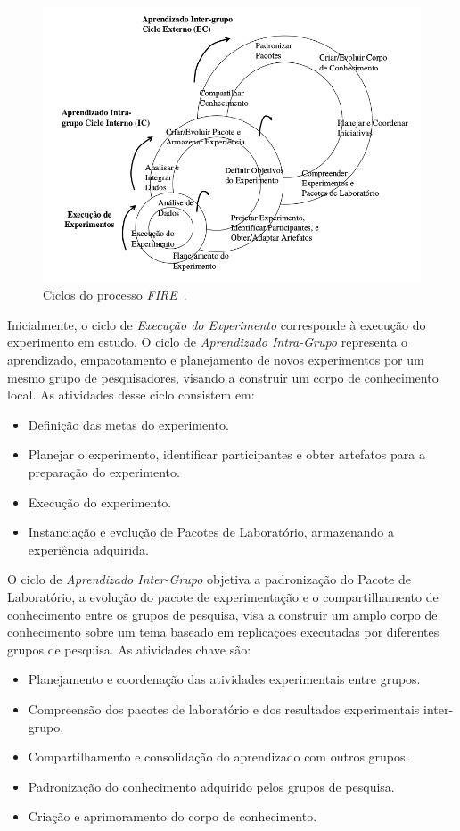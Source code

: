 \begin{figure}[!htb]
\centering
\includegraphics[width=\textwidth]{images/fire.png}
\caption{Ciclos do processo \textit{FIRE}~\cite{mendoncca2008framework}.}\label{image:fire}
\end{figure}

Inicialmente, o ciclo de \textit{Execução do Experimento} corresponde à execução do experimento em estudo. O ciclo de \textit{Aprendizado Intra-Grupo} representa o aprendizado, empacotamento e planejamento de novos experimentos por um mesmo grupo de pesquisadores, visando a construir um corpo de conhecimento local. As atividades desse ciclo consistem em:

\begin{itemize}
\item Definição das metas do experimento.
\item Planejar o experimento, identificar participantes e obter artefatos para a preparação do experimento.
\item Execução do experimento.
\item Instanciação e evolução de Pacotes de Laboratório, armazenando a experiência adquirida.
\end{itemize}

O ciclo de \textit{Aprendizado Inter-Grupo} objetiva a padronização do Pacote de Laboratório, a evolução do pacote de experimentação e o compartilhamento de conhecimento entre os grupos de pesquisa, visa a construir um amplo corpo de conhecimento sobre um tema baseado em replicações executadas por diferentes grupos de pesquisa. As atividades chave
são:

\begin{itemize}
\item Planejamento e coordenação das atividades experimentais entre grupos.
\item Compreensão dos pacotes de laboratório e dos resultados experimentais inter-grupo.
\item Compartilhamento e consolidação do aprendizado com outros grupos.
\item Padronização do conhecimento adquirido pelos grupos de pesquisa.
\item Criação e aprimoramento do corpo de conhecimento.

\end{itemize}

